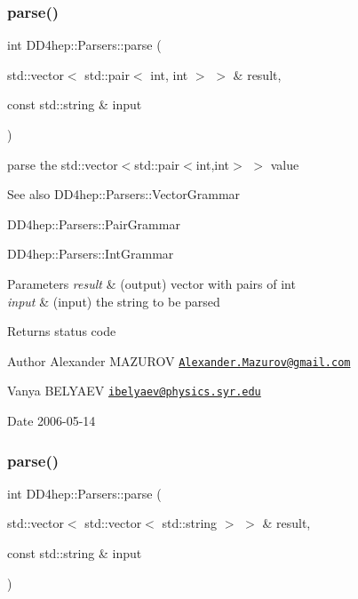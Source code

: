 \subsubsection{\texorpdfstring{parse()}{parse()}\hspace{0.1cm}{\footnotesize\ttfamily [3/21]}}
{\footnotesize\ttfamily int D\+D4hep\+::\+Parsers\+::parse (\begin{DoxyParamCaption}\item[{std\+::vector$<$ std\+::pair$<$ int, int $>$ $>$ \&}]{result,  }\item[{const std\+::string \&}]{input }\end{DoxyParamCaption})}



parse the {\ttfamily std\+::vector$<$std\+::pair$<$int,int$>$ $>$} value 

\begin{DoxySeeAlso}{See also}
D\+D4hep\+::\+Parsers\+::\+Vector\+Grammar 

D\+D4hep\+::\+Parsers\+::\+Pair\+Grammar 

D\+D4hep\+::\+Parsers\+::\+Int\+Grammar 
\end{DoxySeeAlso}

\begin{DoxyParams}{Parameters}
{\em result} & (output) vector with pairs of int \\
\hline
{\em input} & (input) the string to be parsed \\
\hline
\end{DoxyParams}
\begin{DoxyReturn}{Returns}
status code
\end{DoxyReturn}
\begin{DoxyAuthor}{Author}
Alexander M\+A\+Z\+U\+R\+OV \href{mailto:Alexander.Mazurov@gmail.com}{\tt Alexander.\+Mazurov@gmail.\+com} 

Vanya B\+E\+L\+Y\+A\+EV \href{mailto:ibelyaev@physics.syr.edu}{\tt ibelyaev@physics.\+syr.\+edu} 
\end{DoxyAuthor}
\begin{DoxyDate}{Date}
2006-\/05-\/14 
\end{DoxyDate}
\hypertarget{namespace_d_d4hep_1_1_parsers_afd6bbff0d1fc52ec885e45126f670506}{}\label{namespace_d_d4hep_1_1_parsers_afd6bbff0d1fc52ec885e45126f670506} 
\subsubsection{\texorpdfstring{parse()}{parse()}\hspace{0.1cm}{\footnotesize\ttfamily [4/21]}}
{\footnotesize\ttfamily int D\+D4hep\+::\+Parsers\+::parse (\begin{DoxyParamCaption}\item[{std\+::vector$<$ std\+::vector$<$ std\+::string $>$ $>$ \&}]{result,  }\item[{const std\+::string \&}]{input }\end{DoxyParamCaption})}



